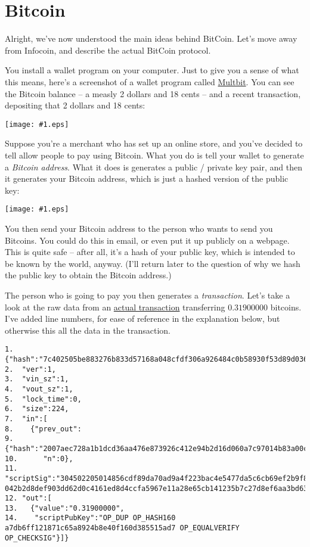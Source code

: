\documentclass[12pt]{book}
\newcommand{\img}[2]{\begin{center}\texttt{[image: \#1.eps]}\end{center}}
\newcommand{\link}[2]{\href{#1}{#2}}
\begin{document}
\section{Bitcoin}

Alright, we've now understood the main ideas behind BitCoin.  Let's
move away from Infocoin, and describe the actual BitCoin protocol.

You install a wallet program on your computer.  Just to give you a
sense of what this means, here's a screenshot of a wallet program
called \link{XXX}{Multbit}.  You can see the Bitcoin balance -- a
measly 2 dollars and 18 cents -- and a recent transaction, depositing
that 2 dollars and 18 cents:
% 
\img{images/wallet_transaction}{400px}
%
Suppose you're a merchant who has set up an online store, and you've
decided to tell allow people to pay using Bitcoin.  What you do is
tell your wallet to generate a \emph{Bitcoin address}.  What it does
is generates a public / private key pair, and then it generates your
Bitcoin address, which is just a hashed version of the public key:
%
\img{images/bitcoin_address}{400px}
%
You then send your Bitcoin address to the person who wants to send you
Bitcoins.  You could do this in email, or even put it up publicly on a
webpage.  This is quite safe -- after all, it's a hash of your public
key, which is intended to be known by the world, anyway.  (I'll return
later to the question of why we hash the public key to obtain the
Bitcoin address.)

The person who is going to pay you then generates a
\emph{transaction}.  Let's take a look at the raw data from an
\link{http://blockexplorer.com/tx/7c402505be883276b833d57168a048cfdf306a926484c0b58930f53d89d036f9}{actual
  transaction} transferring $0.31900000$ bitcoins.  I've added line
numbers, for ease of reference in the explanation below, but otherwise
this all the data in the transaction.

\begin{verbatim} 
1.  {"hash":"7c402505be883276b833d57168a048cfdf306a926484c0b58930f53d89d036f9",
2.  "ver":1,
3.  "vin_sz":1,
4.  "vout_sz":1,
5.  "lock_time":0,
6.  "size":224,
7.  "in":[
8.    {"prev_out":
9.      {"hash":"2007aec728a1b1dcd36aa476e873926c412e94b2d16d060a7c97014b83a00c3e",
10.      "n":0},
11.    "scriptSig":"304502205014856cdf89da70ad9a4f223bac4e5477da5c6cb69ef2b9f8b5f8548e21307e0221009bfe2698f1eb1c561f41981d8e78c11d9e685a70e682f144ee6c8ab5ecb0497c01 042b2d8def903dd62d0c4161ed8d4ccfa5967e11a28e65cb141235b7c27d8ef6aa3bd63be077323cf3d7e0e8895b264b94feb4b40478b431da6f45dfc8e1004f62"}],
12. "out":[
13.   {"value":"0.31900000",
14.    "scriptPubKey":"OP_DUP OP_HASH160 a7db6ff121871c65a8924b8e40f160d385515ad7 OP_EQUALVERIFY OP_CHECKSIG"}]}
\end{verbatim}
\end{document}
